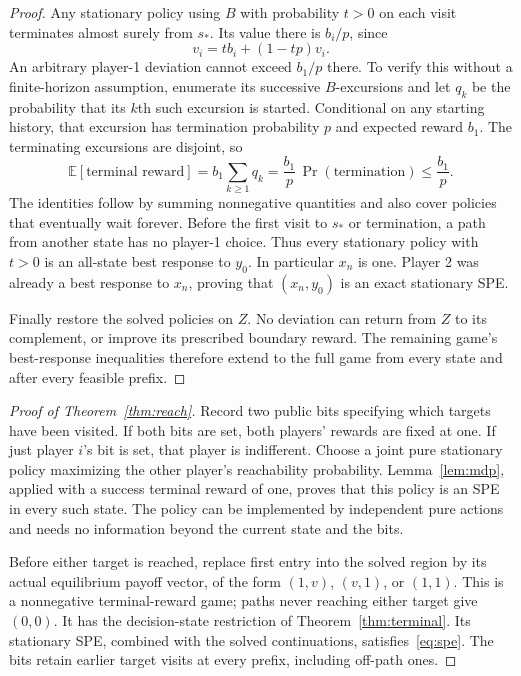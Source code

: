 \documentclass[11pt]{article}
\newcommand{\E}{\mathbb E}
\begin{document}
\begin{proof}
Any stationary policy using $B$ with probability $t>0$ on each visit
terminates almost surely from $s_*$. Its value there is $b_i/p$, since
\[
 v_i=t b_i+(1-tp)v_i.
\]
An arbitrary player-1 deviation cannot exceed $b_1/p$ there. To verify
this without a finite-horizon assumption, enumerate its successive
$B$-excursions and let $q_k$ be the probability that its $k$th such
excursion is started. Conditional on any starting history, that
excursion has termination probability $p$ and expected reward $b_1$.
The terminating excursions are disjoint, so
\[
 \E[\text{terminal reward}]=b_1\sum_{k\geq1}q_k
 =\frac{b_1}{p}\,\Pr(\text{termination})\leq\frac{b_1}{p}.
\]
The identities follow by summing nonnegative quantities and also cover
policies that eventually wait forever. Before the first visit to $s_*$
or termination, a path from another state has no player-1 choice.
Thus every stationary policy with $t>0$ is an all-state best response
to $y_0$. In particular $x_n$ is one. Player 2 was already a best
response to $x_n$, proving that $(x_n,y_0)$ is an exact stationary SPE.

Finally restore the solved policies on $Z$. No deviation can return
from $Z$ to its complement, or improve its prescribed boundary reward.
The remaining game's best-response inequalities therefore extend to
the full game from every state and after every feasible prefix.
\end{proof}

\begin{proof}[Proof of Theorem~\ref{thm:reach}]
Record two public bits specifying which targets have been visited.
If both bits are set, both players' rewards are fixed at one.
If just player $i$'s bit is set, that player is indifferent. Choose a
joint pure stationary policy maximizing the other player's reachability
probability. Lemma~\ref{lem:mdp}, applied with a success terminal reward
of one, proves that this policy is an SPE in every such state.
The policy can be implemented by independent pure actions and needs
no information beyond the current state and the bits.

Before either target is reached, replace first entry into the solved
region by its actual equilibrium payoff vector, of the form $(1,v)$,
$(v,1)$, or $(1,1)$. This is a nonnegative terminal-reward game;
paths never reaching either target give $(0,0)$. It has the decision-state
restriction of Theorem~\ref{thm:terminal}. Its stationary SPE, combined
with the solved continuations, satisfies~\eqref{eq:spe}. The bits
retain earlier target visits at every prefix, including off-path ones.
\end{proof}
\end{document}
